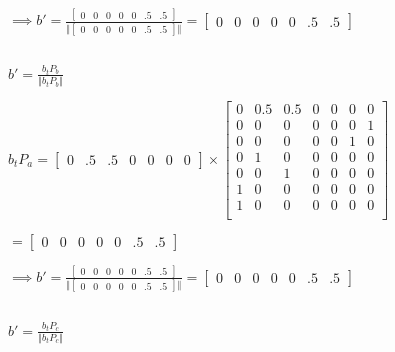 \documentclass[12pt]{article}
\begin{document}
$\implies b' = \frac{\begin{bmatrix}0 & 0 & 0 & 0 & 0 & .5 & .5\end{bmatrix}}{\Vert\begin{bmatrix}0 & 0 & 0 & 0 & 0 & .5 & .5\end{bmatrix}\Vert} = \begin{bmatrix}0 & 0 & 0 & 0 & 0 & .5 & .5\end{bmatrix}$

\subsection{}

$ b' = \frac{b_t P_b}{\Vert b_t P_b \Vert} $

$ b_t P_a = \begin{bmatrix}0 & .5 & .5 & 0 & 0 & 0 & 0\end{bmatrix} \times \begin{bmatrix}
0   & 0.5 & 0.5 & 0   & 0   & 0   & 0 \\
0   & 0   & 0   & 0   & 0   & 0   & 1 \\
0   & 0   & 0   & 0   & 0   & 1   & 0 \\
0   & 1   & 0   & 0   & 0   & 0   & 0 \\
0   & 0   & 1   & 0   & 0   & 0   & 0 \\
1   & 0   & 0   & 0   & 0   & 0   & 0 \\
1   & 0   & 0   & 0   & 0   & 0   & 0 \\
\end{bmatrix}$

$ = \begin{bmatrix}0 & 0 & 0 & 0 & 0 & .5 & .5\end{bmatrix} $

$\implies b' = \frac{\begin{bmatrix}0 & 0 & 0 & 0 & 0 & .5 & .5\end{bmatrix}}{\Vert\begin{bmatrix}0 & 0 & 0 & 0 & 0 & .5 & .5\end{bmatrix}\Vert} = \begin{bmatrix}0 & 0 & 0 & 0 & 0 & .5 & .5\end{bmatrix} $

\subsection{}

$ b' = \frac{b_t P_c}{\Vert b_t P_c \Vert} $
\end{document}
